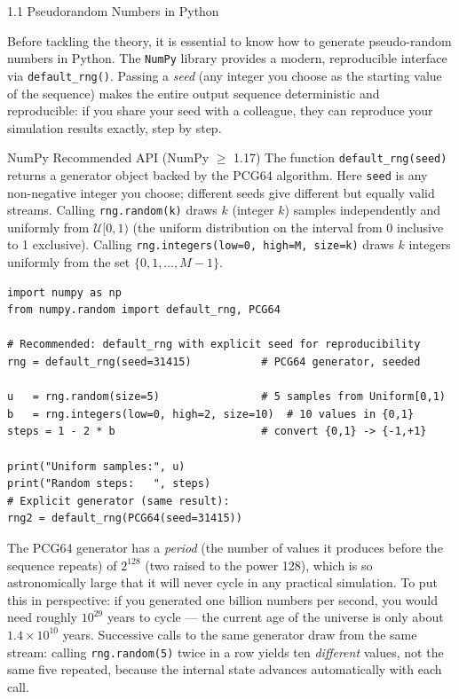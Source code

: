 \documentclass[aspectratio=169,10pt]{beamer}
\begin{document}
\begin{frame}[fragile]{1.1 Pseudorandom Numbers in Python}

  Before tackling the theory, it is essential to know how to generate
  pseudo-random numbers in Python.  The \texttt{NumPy} library provides a
  modern, reproducible interface via \texttt{default\_rng()}.  Passing a
  \emph{seed} (any integer you choose as the starting value of the sequence)
  makes the entire output sequence deterministic and reproducible: if you
  share your seed with a colleague, they can reproduce your simulation results
  exactly, step by step.

  \begin{block}{NumPy Recommended API (NumPy $\ge$ 1.17)}
    The function \texttt{default\_rng(seed)} returns a generator object backed
    by the PCG64 algorithm.  Here \texttt{seed} is any non-negative integer
    you choose; different seeds give different but equally valid streams.
    Calling \texttt{rng.random(k)} draws $k$ (integer $k$) samples
    independently and uniformly from $\mathcal{U}[0,1)$ (the uniform
    distribution on the interval from 0 inclusive to 1 exclusive).
    Calling \texttt{rng.integers(low=0, high=M, size=k)} draws $k$ integers
    uniformly from the set $\{0, 1, \ldots, M-1\}$.
  \end{block}

\begin{lstlisting}[style=python]
import numpy as np
from numpy.random import default_rng, PCG64

# Recommended: default_rng with explicit seed for reproducibility
rng = default_rng(seed=31415)           # PCG64 generator, seeded

u   = rng.random(size=5)                # 5 samples from Uniform[0,1)
b   = rng.integers(low=0, high=2, size=10)  # 10 values in {0,1}
steps = 1 - 2 * b                       # convert {0,1} -> {-1,+1}

print("Uniform samples:", u)
print("Random steps:   ", steps)
# Explicit generator (same result):
rng2 = default_rng(PCG64(seed=31415))
\end{lstlisting}

  The PCG64 generator has a \emph{period} (the number of values it produces
  before the sequence repeats) of $2^{128}$ (two raised to the power 128),
  which is so astronomically large that it will never cycle in any practical
  simulation.  To put this in perspective: if you generated one billion numbers
  per second, you would need roughly $10^{29}$ years to cycle --- the current
  age of the universe is only about $1.4 \times 10^{10}$ years.  Successive
  calls to the same generator draw from the same stream: calling
  \texttt{rng.random(5)} twice in a row yields ten \emph{different} values,
  not the same five repeated, because the internal state advances automatically
  with each call.

\end{frame}
\end{document}
